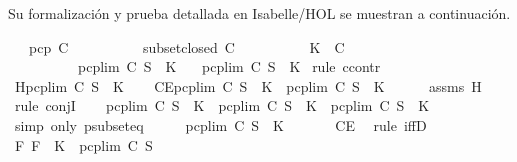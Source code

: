 \begin{isabellebody}
\begin{isamarkuptext}
  Su formalización y prueba detallada en Isabelle/HOL se muestran a continuación.%
\end{isamarkuptext}\isamarkuptrue%
\isamarkupfalse%
\isanewline
\ \ \ {\isachardoublequoteopen}pcp\ C{\isachardoublequoteclose}\isanewline
\ \ \ \ \ \ \ \ \ \ {\isachardoublequoteopen}subset{\isacharunderscore}closed\ C{\isachardoublequoteclose}\isanewline
\ \ \ \ \ \ \ \ \ \ {\isachardoublequoteopen}K\ {\isasymin}\ C{\isachardoublequoteclose}\isanewline
\ \ \ \ \ \ \ \ \ \ {\isachardoublequoteopen}pcp{\isacharunderscore}lim\ C\ S\ {\isasymsubseteq}\ K{\isachardoublequoteclose}\isanewline
\ \ \ {\isachardoublequoteopen}pcp{\isacharunderscore}lim\ C\ S\ {\isacharequal}\ K{\isachardoublequoteclose}\isanewline
%
\isadelimproof
%
\endisadelimproof
%
\isatagproof
{}\isamarkupfalse%
\ {\isacharparenleft}rule\ ccontr{\isacharparenright}\isanewline
\ \ \isamarkupfalse%
\ H{\isacharcolon}{\isachardoublequoteopen}{\isasymnot}{\isacharparenleft}pcp{\isacharunderscore}lim\ C\ S\ {\isacharequal}\ K{\isacharparenright}{\isachardoublequoteclose}\isanewline
\ \ \isamarkupfalse%
\ CE{\isacharcolon}{\isachardoublequoteopen}pcp{\isacharunderscore}lim\ C\ S\ {\isasymsubseteq}\ K\ {\isasymand}\ pcp{\isacharunderscore}lim\ C\ S\ {\isasymnoteq}\ K{\isachardoublequoteclose}\isanewline
\ \ \ \ \isamarkupfalse%
\ assms{\isacharparenleft}{}{\isacharparenright}\ H\ \isamarkupfalse%
\ {\isacharparenleft}rule\ conjI{\isacharparenright}\isanewline
\ \ \isamarkupfalse%
\ {\isachardoublequoteopen}pcp{\isacharunderscore}lim\ C\ S\ {\isasymsubseteq}\ K\ {\isasymand}\ pcp{\isacharunderscore}lim\ C\ S\ {\isasymnoteq}\ K\ {\isasymlongleftrightarrow}\ pcp{\isacharunderscore}lim\ C\ S\ {\isasymsubset}\ K{\isachardoublequoteclose}\isanewline
\ \ \ \ \isamarkupfalse%
\ {\isacharparenleft}simp\ only{\isacharcolon}\ psubset{\isacharunderscore}eq{\isacharparenright}\isanewline
\ \ \isamarkupfalse%
\ \isamarkupfalse%
\ {\isachardoublequoteopen}pcp{\isacharunderscore}lim\ C\ S\ {\isasymsubset}\ K{\isachardoublequoteclose}\ \isanewline
\ \ \ \ \isamarkupfalse%
\ CE\ \isamarkupfalse%
\ {\isacharparenleft}rule\ iffD{}{\isacharparenright}\isanewline
\ \ \isamarkupfalse%
\ \isamarkupfalse%
\ {\isachardoublequoteopen}{\isasymexists}F{\isachardot}\ F\ {\isasymin}\ {\isacharparenleft}K\ {\isacharminus}\ {\isacharparenleft}pcp{\isacharunderscore}lim\ C\ S{\isacharparenright}{\isacharparenright}{\isachardoublequoteclose}\isanewline

\end{isabellebody}
